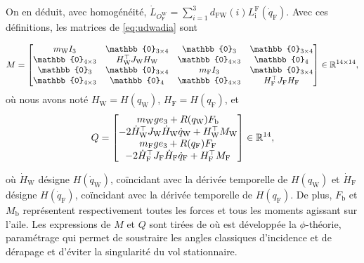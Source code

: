 On en déduit, avec homogénéité, $\dot{L}_{O_{\text{F}}^{\text{W}}} = \sum_{i=1}^{3} d_{\text{FW}}(i) L_{\text{i}}^{\text{F}} (\dot{q}_{\text{F}})$. Avec ces définitions, les matrices de \eqref{eq:udwadia} sont

\begin{align}
    M = \begin{bmatrix}
        m_{\text{W}} I_{3} & \mathbb{0}_{3 \times 4} & \mathbb{0}_{3} & \mathbb{0}_{3 \times 4}\\
        \mathbb{0}_{4 \times 3} & H_{\text{W}}^\top J_{\text{W}} H_{\text{W}} & \mathbb{0}_{4 \times 3} & \mathbb{0}_{4}\\
        \mathbb{0}_{3} & \mathbb{0}_{3 \times 4} & m_{\text{F}} I_{3} & \mathbb{0}_{3 \times 4} \\
        \mathbb{0}_{4 \times 3} & \mathbb{0}_{4 } & \mathbb{0}_{4 \times 3} & H_{\text{F}}^\top J_{\text{F}} H_{\text{F}}    \end{bmatrix}\in \real^{14\times14},
\end{align}
où nous avons noté $H_{\text{W}} = H(q_{\text{W}})$, $H_{\text{F}} = H(q_{\text{F}})$, et
\begin{align}
    Q = \begin{bmatrix}
            m_{\text{W}} g e_3 + R(q_{\text{W}}) F_{\text{b}}\\
            -2\dot{H}_{\text{W}}^\top J_{\text{W}} \dot{H}_{\text{W}} \dot{q}_{\text{W}} + H_{\text{W}}^\top M_{\text{W}}\\
            m_{\text{F}} g e_3 + R(q_{\text{F}}) F_{\text{F}}\\
            -2\dot{H}_{\text{F}}^\top J_{\text{F}} \dot{H}_{\text{F}} \dot{q}_{\text{F}} + H_{\text{F}}^\top M_{\text{F}}\\
        \end{bmatrix} \in {\mathbb R}^{14},
\end{align}

où $\dot{H}_{\text{W}}$ désigne $H(\dot{q}_{\text{W}})$, coïncidant avec la dérivée temporelle de $H(q_{\text{W}})$ et $\dot{H}_{\text{F}}$ désigne $H(\dot{q}_{\text{F}})$, coïncidant avec la dérivée temporelle de $H(q_{\text{F}})$. De plus, $F_{\text{b}}$ et $M_{\text{b}}$ représentent respectivement toutes les forces et tous les moments agissant sur l'aile. Les expressions de $M$ et $Q$ sont tirées de \cite[équations (45) et (57)]{lustosaHal-03035938} où est développée la $\phi$-théorie, paramétrage qui permet de soustraire les angles classiques d'incidence et de dérapage et d'éviter la singularité du vol stationnaire. 

